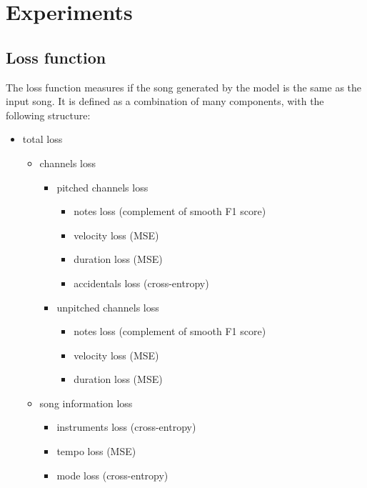 \documentclass[en]{pracamgr}
\begin{document}
\chapter{Experiments}

\section{Loss function}

The loss function measures if the song generated by the model is the same as the input song. It is defined as a combination of many components, with the following structure:
\begin{itemize}
    \item total loss
	\begin{itemize}
	    \item channels loss
		\begin{itemize}
			\item pitched channels loss
            \begin{itemize}
                \item notes loss (complement of smooth F1 score)
                \item velocity loss (MSE)
                \item duration loss (MSE)
                \item accidentals loss (cross-entropy)
            \end{itemize}
			\item unpitched channels loss
            \begin{itemize}
                \item notes loss (complement of smooth F1 score)
                \item velocity loss (MSE)
                \item duration loss (MSE)
            \end{itemize}
		\end{itemize}
        \item song information loss
        \begin{itemize}
            \item instruments loss (cross-entropy)
            \item tempo loss (MSE)
            \item mode loss (cross-entropy)
        \end{itemize}
	\end{itemize}
\end{itemize}
\end{document}
